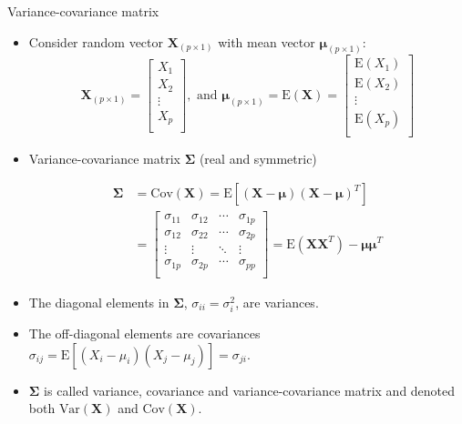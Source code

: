 \documentclass[ignorenonframetext,]{beamer}
\begin{document}
\begin{frame}

\begin{block}{Variance-covariance matrix}

\begin{itemize}
\item
  Consider random vector \(\mathbf{X}_{(p\times 1)}\) with mean vector
  \(\mathbf{\mu}_{(p\times 1)}\):
  \[\mathbf{X}_{(p\times 1)} =\left[ \begin{array}{c} X_1\\ X_2\\ \vdots\\ X_p\\ \end{array} \right], \text{ and }\mathbf{\mu}_{(p\times 1)} =\text{E}(\mathbf{X})=\left[ \begin{array}{c} \text{E}(X_1)\\ \text{E}(X_2)\\ \vdots\\ \text{E}(X_p)\\ \end{array}\right]\]
\item
  Variance-covariance matrix \(\mathbf\Sigma\) (real and symmetric)

  \begin{align*}
  \mathbf\Sigma & =\text{Cov}(\mathbf{X})  
  =\text{E}[(\mathbf{X}-\mathbf{\mu})(\mathbf{X}-\mathbf{\mu})^T] \\
  & = \left[ \begin{array}{cccc} \sigma_{11} & \sigma_{12} & \cdots & \sigma_{1p}\\ \sigma_{12} & \sigma_{22} & \cdots & \sigma_{2p}\\ \vdots & \vdots & \ddots & \vdots\\ \sigma_{1p} & \sigma_{2p} & \cdots & \sigma_{pp}\\ \end{array}  \right] 
   = \text{E}(\mathbf{X}\mathbf{X}^T)-\mathbf{\mu}\mathbf{\mu}^T
  \end{align*}
\end{itemize}

\end{block}

\end{frame}

\begin{frame}

\begin{itemize}
\item
  The diagonal elements in \(\mathbf\Sigma\),
  \(\sigma_{ii}=\sigma_i^2\), are variances.
\item
  The off-diagonal elements are covariances
  \(\sigma_{ij}=\text{E}[(X_i-\mu_i)(X_j-\mu_j)]=\sigma_{ji}\).
\item
  \(\mathbf\Sigma\) is called variance, covariance and
  variance-covariance matrix and denoted both \(\text{Var}(\mathbf{X})\)
  and \(\text{Cov}(\mathbf{X})\).
\end{itemize}

\end{frame}
\end{document}
